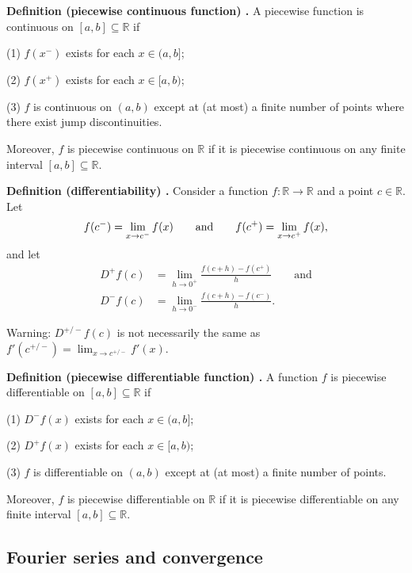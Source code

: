 \begin{shaded}
\textbf{Definition (piecewise continuous function) \cite{math2111_notes}.} A piecewise function is continuous on $[a, b] \subseteq \mathbb{R}$ if

(1) $f(x^-)$ exists for each $x \in (a, b]$;

(2) $f(x^+)$ exists for each $x \in [a, b)$;

(3) $f$ is continuous on $(a, b)$ except at (at most) a finite number of points where there exist jump discontinuities.

Moreover, $f$ is piecewise continuous on $\mathbb{R}$ if it is piecewise continuous on any finite interval $[a, b] \subseteq \mathbb{R}$.
\end{shaded}

\begin{shaded}
\textbf{Definition (differentiability) \cite{math2111_notes}.} Consider a function $ f : \mathbb{R} \to \mathbb{R} $ and a point $c \in \mathbb{R}$. Let
$$ f(c^-) = \lim_{x \to c^-} f(x) \qquad \textnormal{and} \qquad f(c^+) = \lim_{x \to c^+} f(x) , $$
and let
\begin{align*}
	D^+ f(c) &= \lim_{h \to 0^+} \frac{f(c + h) - f(c^+)}{h} \qquad \text{and} \\
	D^- f(c) &= \lim_{h \to 0^-} \frac{f(c + h) - f(c^-)}{h} .
\end{align*}

Warning: $D^{+/-} f(c)$ is not necessarily the same as $f'(c^{+/-}) = \lim_{x \to c^{+/-}} f'(x)$.
\end{shaded}

\begin{shaded}
\textbf{Definition (piecewise differentiable function) \cite{math2111_notes}.} A function $f$ is piecewise differentiable on $[a, b] \subseteq \mathbb{R}$ if

(1) $D^- f(x)$ exists for each $x \in (a, b]$;

(2) $D^+ f(x)$ exists for each $x \in [a, b)$;

(3) $f$ is differentiable on $(a, b)$ except at (at most) a finite number of points.

Moreover, $f$ is piecewise differentiable on $\mathbb{R}$ if it is piecewise differentiable on any finite interval $[a, b] \subseteq \mathbb{R}$.
\end{shaded}

\subsection{Fourier series and convergence}

